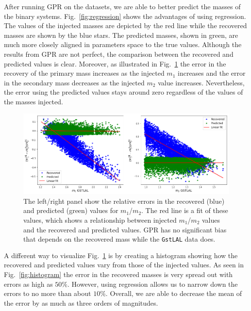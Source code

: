 \documentclass[aps,prd,twocolumn,superscriptaddress,preprintnumbers,floatfix,nofootinbib]{revtex4-2}
\begin{document}
After running GPR on the datasets, we are able to better predict the masses of the binary 
systems. Fig.~\ref{fig:regression} shows the advantages of using regression. The values of 
the injected masses are depicted by the red line while the recovered masses are shown 
by the blue stars. The predicted masses, shown in green, are much more closely aligned in 
parameters space to the true values. Although the results from GPR are not perfect, the 
comparison between the recovered and predicted values is clear. Moreover, as illustrated in 
Fig.~\ref{fig:fits} the error in the recovery of the primary mass increases as 
the injected $m_1$ increases and the error in the secondary mass decreases as 
the injected $m_2$ value increases. Nevertheless, the error using the predicted values 
stays around zero regardless of the values of the masses injected. 

\begin{figure}[!h]
	\centering
	\includegraphics[width=\linewidth]{m1_m2_errors_and_fits.png}
	\caption{%
	 		The left/right panel show the relative errors in the recovered (blue) and 
			predicted (green) values for $m_1$/$m_2$. The red line is a fit of these values, which 
			shows a relationship between injected $m_1$/$m_2$ values and the recovered and 
			predicted values. GPR has no significant bias that depends on the recovered mass 
			while the \texttt{GstLAL} data does.}
 	\label{fig:fits}
\end{figure}

A different way to visualize Fig.~\ref{fig:fits} is by creating a histogram showing how the 
recovered and predicted values vary from those of the injected values. As seen in 
Fig.~\ref{fig:histogram} the error in the recovered masses is very spread out with errors as high 
as $50\%$. However, using regression allows us to narrow down the errors to no more than 
about $10\%$. Overall, we are able to decrease the mean of the error by as much as three 
orders of magnitudes.
\end{document}
